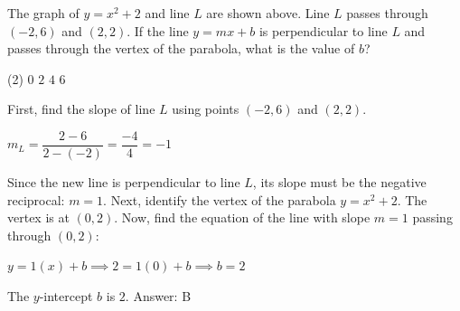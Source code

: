 \documentclass[11pt,paper=a4,answers]{exam}
\begin{document}
\begin{questions}
\vspace{1cm}

\question
\begin{center}
\end{center}
The graph of $y = x^2 + 2$ and line $L$ are shown above. Line $L$ passes through $(-2, 6)$ and $(2, 2)$. If the line $y = mx + b$ is perpendicular to line $L$ and passes through the vertex of the parabola, what is the value of $b$?
\begin{tasks}(2)
\task $0$ \task $2$ \task $4$ \task $6$
\end{tasks}

\begin{solution}
First, find the slope of line $L$ using points $(-2, 6)$ and $(2, 2)$.
\vspace{5pt}
\begin{center}
$m_L = \dfrac{2 - 6}{2 - (-2)} = \dfrac{-4}{4} = -1$
\end{center}
\vspace{5pt}
Since the new line is perpendicular to line $L$, its slope must be the negative reciprocal: $m = 1$.
\vspace{5pt}
Next, identify the vertex of the parabola $y = x^2 + 2$. The vertex is at $(0, 2)$.
\vspace{5pt}
Now, find the equation of the line with slope $m = 1$ passing through $(0, 2)$:
\vspace{5pt}
\begin{center}
$y = 1(x) + b \implies 2 = 1(0) + b \implies b = 2$
\end{center}
\vspace{5pt}
The $y$-intercept $b$ is $2$.
\vspace{5pt}
Answer: \colorbox{yellow!100}{B}
\end{solution}

\vspace{1cm}


\end{questions}
\end{document}

